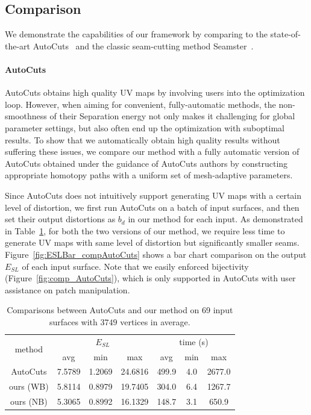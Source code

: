 \subsection{Comparison}

We demonstrate the capabilities of our framework by comparing to the state-of-the-art AutoCuts~\cite{Poranne2017Autocuts} and the classic seam-cutting method Seamster~\cite{Sheffer2002Seamster}.

\paragraph{AutoCuts}
AutoCuts obtains high quality UV maps by involving users into the optimization loop. However, when aiming for convenient, fully-automatic methods, the non-smoothness of their Separation energy not only makes it challenging for global parameter settings, but also often end up the optimization with suboptimal results. To show that we automatically obtain high quality results without suffering these issues, we compare our method with a fully automatic version of AutoCuts obtained under the guidance of AutoCuts authors by constructing appropriate homotopy paths with a uniform set of mesh-adaptive parameters.

Since AutoCuts does not intuitively support generating UV maps with a certain level of distortion, we first run AutoCuts on a batch of input surfaces, and then set their output distortions as $b_d$ in our method for each input. As demonstrated in Table~\ref{tb:comp_AutoCuts}, for both the two versions of our method, we require less time to generate UV maps with same level of distortion but significantly smaller seams. Figure~\ref{fig:ESLBar_compAutoCuts} shows a bar chart comparison on the output $E_{SL}$ of each input surface. Note that we easily enforced bijectivity (Figure~\ref{fig:comp_AutoCuts}), which is only supported in AutoCuts with user assistance on patch manipulation.

\begin{table}[!h]
\centering
\caption{Comparisons between AutoCuts and our method on 69 input surfaces with $3749$ vertices in average.}
\label{tb:comp_AutoCuts}
\begin{tabular}{|c|ccc|ccc|}
\hline
\multirow{2}{*}{method} & \multicolumn{3}{c|}{$E_{SL}$} & \multicolumn{3}{c|}{time (s)} \\ \cline{2-7} 
                        & avg      & min     & max      & avg      & min    & max       \\ \hline
AutoCuts                & 7.5789   & 1.2069  & 24.6816  & 499.9    & 4.0    & 2677.0    \\
ours (WB)               & 5.8114   & 0.8979  & 19.7405  & 304.0    & 6.4    & 1267.7     \\
ours (NB)               & 5.3065   & 0.8992  & 16.1329  & 148.7    & 3.1    & 650.9    \\ \hline
\end{tabular}
\end{table}

